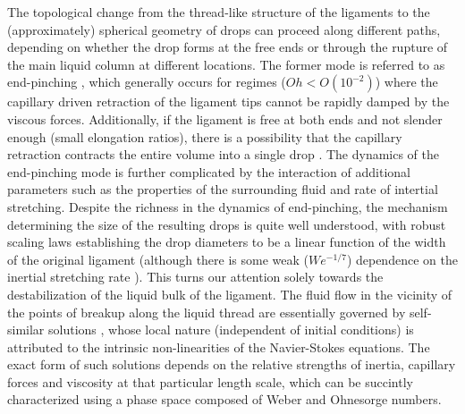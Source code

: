 The topological change from the thread-like structure of the ligaments to the 
(approximately) spherical geometry of drops can proceed along different paths, 
depending on whether the drop forms at the free ends or through the 
rupture of the main liquid column at different locations. 
The former mode is referred to as end-pinching \cite{end_pinch_1,end_pinch_2}, 
which generally occurs for regimes ($Oh < O(10^{-2})$) where the capillary driven
retraction of the ligament tips cannot be rapidly damped by the viscous forces. 
Additionally, if the ligament is free at both ends and not slender enough (small elongation ratios), 
there is a possibility that the capillary retraction contracts the entire volume into a single drop \cite{stone_1}. 
The dynamics of the end-pinching mode is further complicated by the interaction of 
additional parameters such as the properties of the surrounding fluid and rate of intertial stretching. 
Despite the richness in the dynamics of end-pinching, the mechanism determining the size of the resulting
drops is quite well understood, with robust scaling laws establishing the drop diameters to be a linear
function of the width of the original ligament \cite{end_pinch_1} (although there is some weak ($We^{-1/7}$) 
dependence on the inertial stretching rate \cite{end_pinch_3} ).  
This turns our attention solely towards the destabilization of the liquid bulk of the ligament. 
The fluid flow in the vicinity of the points of breakup along the liquid thread 
are essentially governed by self-similar solutions \cite{eggers1997nonlinear}, whose local nature 
(independent of initial conditions) is attributed to the intrinsic non-linearities of the Navier-Stokes equations.  
The exact form of such solutions depends on the relative strengths of inertia, capillary forces and viscosity
at that particular length scale, which can be succintly characterized using a phase space composed of Weber and Ohnesorge numbers.  























































